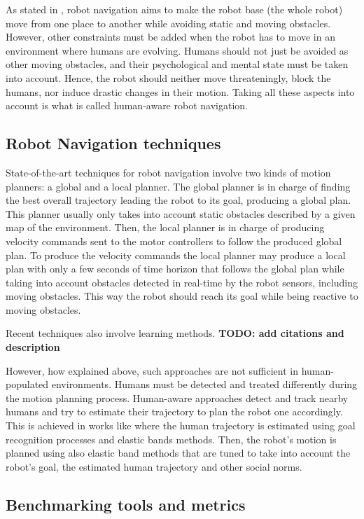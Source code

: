 As stated in \cite{thesisBuisan21}, robot navigation aims to make the robot base (the whole robot) move from one place to another while avoiding static and moving obstacles. However, other constraints must be added when the robot has to move in an environment where humans are evolving. 
Humans should not just be avoided as other moving obstacles, and their psychological and mental state must be taken into account. Hence, the robot should neither move threateningly, block the humans, nor induce drastic changes in their motion. Taking all these aspects into account is what is called human-aware robot navigation.

\subsection{Robot Navigation techniques}

State-of-the-art techniques for robot navigation involve two kinds of motion planners: a global and a local planner. The global planner is in charge of finding the best overall trajectory leading the robot to its goal, producing a global plan. This planner usually only takes into account static obstacles described by a given map of the environment. Then, the local planner is in charge of producing velocity commands sent to the motor controllers to follow the produced global plan. To produce the velocity commands the local planner may produce a local plan with only a few seconds of time horizon that follows the global plan while taking into account obstacles detected in real-time by the robot sensors, including moving obstacles. This way the robot should reach its goal while being reactive to moving obstacles. 

Recent techniques also involve learning methods. \textbf{TODO: add citations and description}

However, how explained above, such approaches are not sufficient in human-populated environments. Humans must be detected and treated differently during the motion planning process. Human-aware approaches detect and track nearby humans and try to estimate their trajectory to plan the robot one accordingly. This is achieved in works like \cite{singamaneni2021human} where the human trajectory is estimated using goal recognition processes and elastic bands methods. Then, the robot's motion is planned using also elastic band methods that are tuned to take into account the robot's goal, the estimated human trajectory and other social norms.   

\subsection{Benchmarking tools and metrics}

